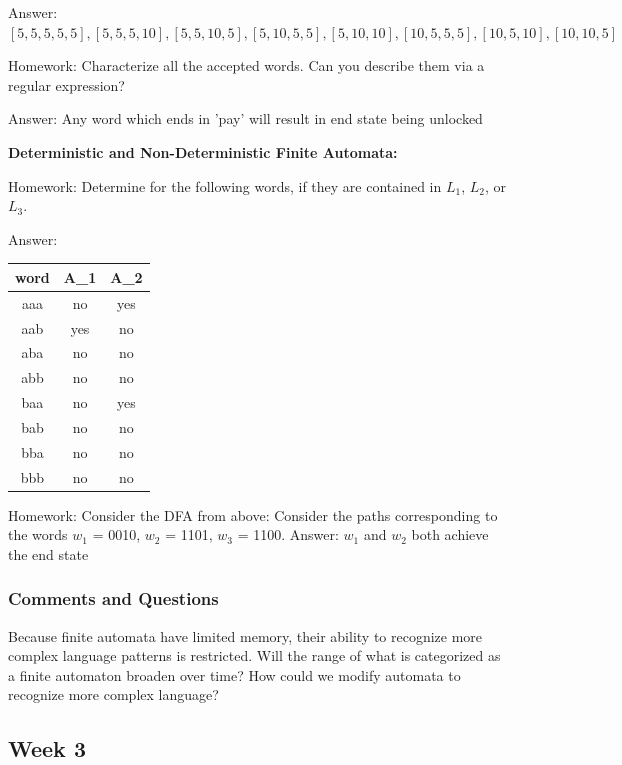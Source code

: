 \documentclass{article}
\theoremstyle{theorem}
\theoremstyle{definition}
\theoremstyle{remark}
\begin{document}
Answer:  $[5, 5, 5, 5, 5], [5, 5, 5, 10], [5, 5, 10, 5], [5, 10, 5, 5], [5, 10, 10], [10, 5, 5, 5], [10, 5, 10], [10, 10, 5]$

Homework: Characterize all the accepted words. Can you describe them via a regular expression?

Answer: Any word which ends in 'pay' will result in end state being unlocked

\textbf{Deterministic and Non-Deterministic Finite Automata:}

Homework: Determine for the following words, if they are contained in $L_{1}$, $L_{2}$, or $L_{3}$.

Answer:
\begin{table}[!ht]
  \centering
  \begin{tabular}{||c c c||} 
   \hline
   word & A\_1 & A\_2 \\ [0.5ex] 
   \hline\hline
   aaa & no  & yes  \\ 
   aab & yes  & no  \\
   aba & no  & no  \\
   abb & no  & no  \\
   baa & no  & yes \\ 
   bab & no & no \\
   bba & no & no \\
   bbb & no & no \\ [1ex] 
   \hline
  \end{tabular}
  \end{table}

Homework: Consider the DFA from above: Consider the paths corresponding to the words $w_{1}$ = 0010, $w_{2}$ = 1101, $w_{3}$ = 1100.\newline
Answer: $w_{1}$ and $w_{2}$ both achieve the end state

\subsubsection*{Comments and Questions}
Because finite automata have limited memory, their ability to recognize more complex language patterns is restricted. Will the range of what is categorized as a finite automaton broaden over time? How could we modify automata to recognize more complex language?

\subsection{Week 3}

\end{document}
